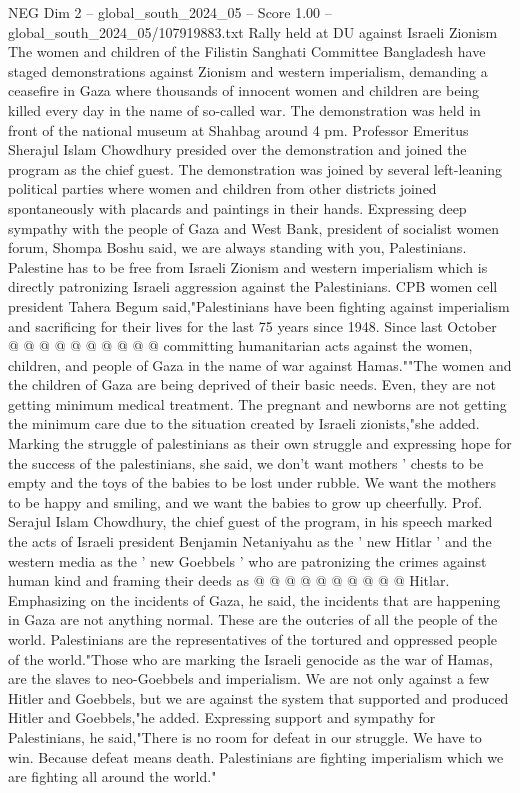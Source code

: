 \begin{textsample}{NEG Dim 2 – global\_south\_2024\_05 – Score 1.00 – global\_south\_2024\_05/107919883.txt}  \label{ex:f2_neg_214}
Rally held at DU against Israeli Zionism The women and children of the Filistin Sanghati Committee Bangladesh have staged demonstrations against Zionism and western imperialism, demanding a ceasefire in Gaza where thousands of innocent women and children are being killed every day in the name of so-called war.
The demonstration was held in front of the national museum at Shahbag around 4 pm.
Professor Emeritus Sherajul Islam Chowdhury presided over the demonstration and joined the program as the chief guest.
The demonstration was joined by several left-leaning political parties where women and children from other districts joined spontaneously with placards and paintings in their hands.
Expressing deep sympathy with the people of Gaza and West Bank, president of socialist women forum, Shompa Boshu said, we are always standing with you, Palestinians.
Palestine has to be free from Israeli Zionism and western imperialism which is directly patronizing Israeli aggression against the Palestinians.
CPB women cell president Tahera Begum said,"Palestinians have been fighting against imperialism and sacrificing for their lives for the last 75 years since 1948.
Since last October @ @ @ @ @ @ @ @ @ @ committing humanitarian acts against the women, children, and people of Gaza in the name of war against Hamas.""The women and the children of Gaza are being deprived of their basic needs.
Even, they are not getting minimum medical treatment.
The pregnant and newborns are not getting the minimum care due to the situation created by Israeli zionists,"she added.
Marking the struggle of palestinians as their own struggle and expressing hope for the success of the palestinians, she said, we don't want mothers ' chests to be empty and the toys of the babies to be lost under rubble.
We want the mothers to be happy and smiling, and we want the babies to grow up cheerfully.
Prof.
Serajul Islam Chowdhury, the chief guest of the program, in his speech marked the acts of Israeli president Benjamin Netaniyahu as the ' new Hitlar ' and the western media as the ' new Goebbels ' who are patronizing the crimes against human kind and framing their deeds as @ @ @ @ @ @ @ @ @ @ Hitlar.
Emphasizing on the incidents of Gaza, he said, the incidents that are happening in Gaza are not anything normal.
These are the outcries of all the people of the world.
Palestinians are the representatives of the tortured and oppressed people of the world."Those who are marking the Israeli genocide as the war of Hamas, are the slaves to neo-Goebbels and imperialism.
We are not only against a few Hitler and Goebbels, but we are against the system that supported and produced Hitler and Goebbels,"he added.
Expressing support and sympathy for Palestinians, he said,"There is no room for defeat in our struggle.
We have to win.
Because defeat means death.
Palestinians are fighting imperialism which we are fighting all around the world."

\end{textsample}
